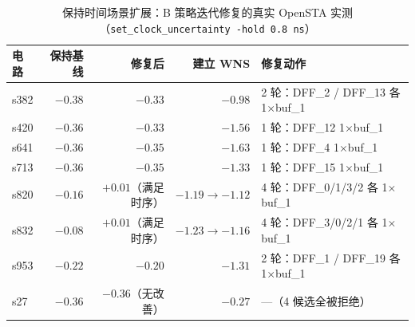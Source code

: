 \documentclass[twocolumn,10pt,fontset=windows]{ctexart}
\begin{document}
\begin{table}[H]
\centering
\caption{保持时间场景扩展：B 策略迭代修复的真实 OpenSTA 实测（\texttt{set\_clock\_uncertainty -hold 0.8\,ns}）}
\label{tab:hold}
\small
\setlength{\tabcolsep}{2pt}
\begin{tabular}{lrrrp{9.2cm}}
\toprule
\textbf{电路} & \textbf{保持基线} & \textbf{修复后} & \textbf{建立 WNS} & \textbf{修复动作} \\
\midrule
s382 & $-0.38$ & $-0.33$ & $-0.98$ & 2 轮：DFF\_2 / DFF\_13 各 1$\times$buf\_1 \\
s420 & $-0.36$ & $-0.33$ & $-1.56$ & 1 轮：DFF\_12 1$\times$buf\_1 \\
s641 & $-0.36$ & $-0.35$ & $-1.63$ & 1 轮：DFF\_4 1$\times$buf\_1 \\
s713 & $-0.36$ & $-0.35$ & $-1.33$ & 1 轮：DFF\_15 1$\times$buf\_1 \\
s820 & $-0.16$ & $+0.01$（满足时序） & $-1.19\rightarrow -1.12$ & 4 轮：DFF\_0/1/3/2 各 1$\times$buf\_1 \\
s832 & $-0.08$ & $+0.01$（满足时序） & $-1.23\rightarrow -1.16$ & 4 轮：DFF\_3/0/2/1 各 1$\times$buf\_1 \\
s953 & $-0.22$ & $-0.20$ & $-1.31$ & 2 轮：DFF\_1 / DFF\_19 各 1$\times$buf\_1 \\
s27 & $-0.36$ & $-0.36$（无改善） & $-0.27$ & ---（4 候选全被拒绝） \\
\bottomrule
\end{tabular}
\end{table}
\end{document}
